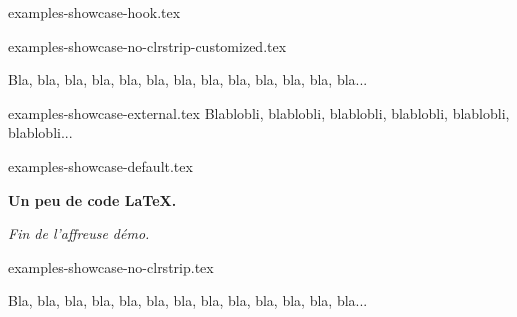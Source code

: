 \begin{filecontents*}[overwrite]{examples-showcase-hook.tex}
\begin{tdocshowcase}
\end{tdocshowcase}
\end{filecontents*}


\begin{filecontents*}[overwrite]{examples-showcase-no-clrstrip-customized.tex}
\begin{tdocshowcase}[nostripe,
                     before = Mon début,
                     after  = Ma fin à moi,
                     color  = green]
    Bla, bla, bla, bla, bla, bla, bla, bla, bla, bla, bla, bla, bla...
\end{tdocshowcase}
\end{filecontents*}


\begin{filecontents*}[overwrite]{examples-showcase-external.tex}
Blablobli, blablobli, blablobli, blablobli, blablobli, blablobli...
\end{filecontents*}


\begin{filecontents*}[overwrite]{examples-showcase-default.tex}
\begin{tdocshowcase}
    \bfseries Un peu de code \LaTeX.

    \bigskip

    \emph{\large Fin de l'affreuse démo.}
\end{tdocshowcase}
\end{filecontents*}


\begin{filecontents*}[overwrite]{examples-showcase-no-clrstrip.tex}
\begin{tdocshowcase}[nostripe]
    Bla, bla, bla, bla, bla, bla, bla, bla, bla, bla, bla, bla, bla...
\end{tdocshowcase}
\end{filecontents*}



\documentclass[10pt, a4paper]{article}

\usepackage[utf8]{inputenc}
\usepackage[T1]{fontenc}

\usepackage[french]{babel, varioref}

\usepackage{enumitem}

\newcommand\thispack{\tdocpack{tutodoc}}

